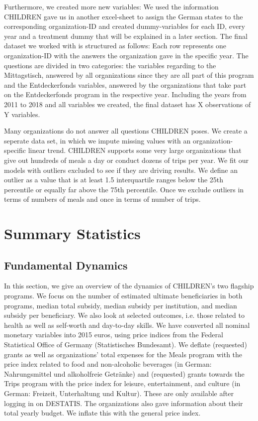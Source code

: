 \documentclass[12pt, a4paper, titlepage]{article}\usepackage[]{graphicx}\usepackage[]{color}
\begin{document}
Furthermore, we created more new variables: We used the information CHILDREN gave us in another excel-sheet to assign the German states to the corresponding organization-ID and created dummy-variables for each ID, every year and a treatment dummy that will be explained in a later section. 
The final dataset we worked with is structured as follows: Each row represents one organization-ID with the answers the organization gave in the specific year. The questions are divided in two categories: the variables regarding to the Mittagstisch, answered by all organizations since they are all part of this program and the Entdeckerfonds variables, answered by the organizations that take part on the Entdeckerfonds program in the respective year. Including the years from 2011 to 2018 and all variables we created, the final dataset has X observations of Y variables.

Many organizations do not answer all questions CHILDREN poses. We create a seperate data set, in which we impute missing values with an organization-specific linear trend. CHILDREN supports some very large organizations that give out hundreds of meals a day or conduct dozens of trips per year. We fit our models with outliers excluded to see if they are driving results. We define an outlier as a value that is at least 1.5 interquartile ranges below the 25th percentile or equally far above the 75th percentile. Once we exclude outliers in terms of numbers of meals and once in terms of number of trips.





\section{Summary Statistics}
\subsection{Fundamental Dynamics} 

In this section, we give an overview of the dynamics of CHILDREN's two flagship programs. We focus on the number of estimated ultimate beneficiaries in both programs, median total subsidy, median subsidy per institution, and median subsidy per beneficiary. We also look at selected outcomes, i.e. those related to health as well as self-worth and day-to-day skills. We have converted all nominal monetary variables into 2015 euros, using price indices from the Federal Statistical Office of Germany (Statistisches Bundesamt). We deflate (requested) grants as well as organizations' total expenses for the Meals program  with the price index related to food and non-alcoholic beverages (in German: Nahrungsmittel und alkoholfreie Getränke) and (requested) grants towards the Trips program with the price index for leisure, entertainment, and culture (in German: Freizeit, Unterhaltung und Kultur). These are only available after logging in on DESTATIS. The organizations also gave information about their total yearly budget. We inflate this with the general price index.
\end{document}
